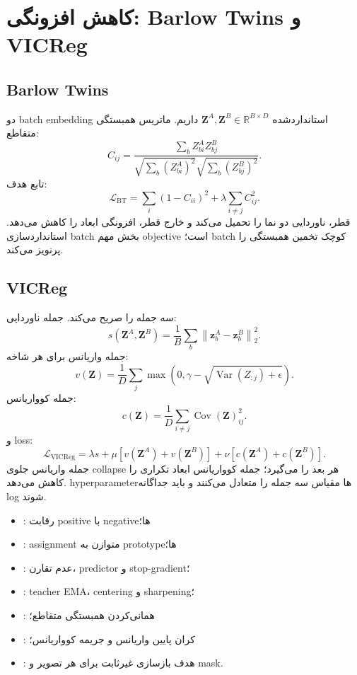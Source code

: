 \documentclass[12pt,openany,oneside]{book}
\newcommand{\R}{\mathbb{R}}
\newcommand{\Var}{\operatorname{Var}}
\newcommand{\Cov}{\operatorname{Cov}}
\newcommand{\norm}[1]{\left\lVert #1\right\rVert}
\newcommand{\vect}[1]{\bm{#1}}
\newcommand{\mat}[1]{\bm{#1}}
\begin{document}
\section{کاهش افزونگی: Barlow Twins و VICReg}
\subsection{Barlow Twins}
دو batch embedding استانداردشده $\mat Z^A,\mat Z^B\in\R^{B\times D}$ داریم. ماتریس همبستگی متقاطع:
\begin{equation}
C_{ij}=\frac{\sum_b Z^A_{bi}Z^B_{bj}}
{\sqrt{\sum_b(Z^A_{bi})^2}\sqrt{\sum_b(Z^B_{bj})^2}}.
\end{equation}
تابع هدف:
\begin{equation}
\mathcal L_{\mathrm{BT}}
=\sum_i(1-C_{ii})^2+\lambda\sum_{i\neq j}C_{ij}^2.
\label{eq:barlow}
\end{equation}
قطر، ناوردایی دو نما را تحمیل می‌کند و خارج قطر، افزونگی ابعاد را کاهش می‌دهد. استانداردسازی batch بخش مهم objective است؛ batch کوچک تخمین همبستگی را پرنویز می‌کند.

\subsection{VICReg}
 سه جمله را صریح می‌کند. جمله ناوردایی:
\begin{equation}
s(\mat Z^A,\mat Z^B)=\frac{1}{B}\sum_b\norm{\vect z_b^A-\vect z_b^B}_2^2.
\end{equation}
جمله واریانس برای هر شاخه:
\begin{equation}
v(\mat Z)=\frac{1}{D}\sum_j\max\left(0,\gamma-\sqrt{\Var(Z_{:j})+\epsilon}\right).
\end{equation}
جمله کوواریانس:
\begin{equation}
c(\mat Z)=\frac{1}{D}\sum_{i\neq j}\Cov(\mat Z)_{ij}^2.
\end{equation}
و loss:
\begin{equation}
\mathcal L_{\mathrm{VICReg}}=\lambda s+\mu[v(\mat Z^A)+v(\mat Z^B)]
+\nu[c(\mat Z^A)+c(\mat Z^B)].
\label{eq:vicreg}
\end{equation}
جمله واریانس جلوی collapse هر بعد را می‌گیرد؛ جمله کوواریانس ابعاد تکراری را کاهش می‌دهد. hyperparameterها مقیاس سه جمله را متعادل می‌کنند و باید جداگانه log شوند.

\begin{keybox}
\begin{itemize}
\item {}: رقابت positive با negativeها؛
\item {}: assignment متوازن به prototypeها؛
\item {}: عدم تقارن، predictor و stop-gradient؛
\item {}: teacher EMA، centering و sharpening؛
\item {}: همانی‌کردن همبستگی متقاطع؛
\item {}: کران پایین واریانس و جریمه کوواریانس؛
\item {}: هدف بازسازی غیرثابت برای هر تصویر و mask.
\end{itemize}
\end{keybox}
\end{document}

